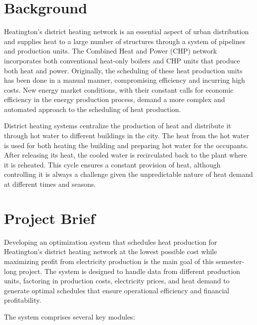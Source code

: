\documentclass[12pt]{report}
\begin{document}
\section{Background}
Heatington's district heating network is an essential aspect of urban distribution and supplies heat to a large number of structures through a system of pipelines and production units. The Combined Heat and Power (CHP) network incorporates both conventional heat-only boilers and CHP units that produce both heat and power. Originally, the scheduling of these heat production units has been done in a manual manner, compromising efficiency and incurring high costs. New energy market conditions, with their constant calls for economic efficiency in the energy production process, demand a more complex and automated approach to the scheduling of heat production.

District heating systems centralize the production of heat and distribute it through hot water to different buildings in the city. The heat from the hot water is used for both heating the building and preparing hot water for the occupants. After releasing its heat, the cooled water is recirculated back to the plant where it is reheated. This cycle ensures a constant provision of heat, although controlling it is always a challenge given the unpredictable nature of heat demand at different times and seasons.

\section{Project Brief}
Developing an optimization system that schedules heat production for Heatington's district heating network at the lowest possible cost while maximizing profit from electricity production is the main goal of this semester-long project. The system is designed to handle data from different production units, factoring in production costs, electricity prices, and heat demand to generate optimal schedules that ensure operational efficiency and financial profitability.

The system comprises several key modules:
\end{document}
